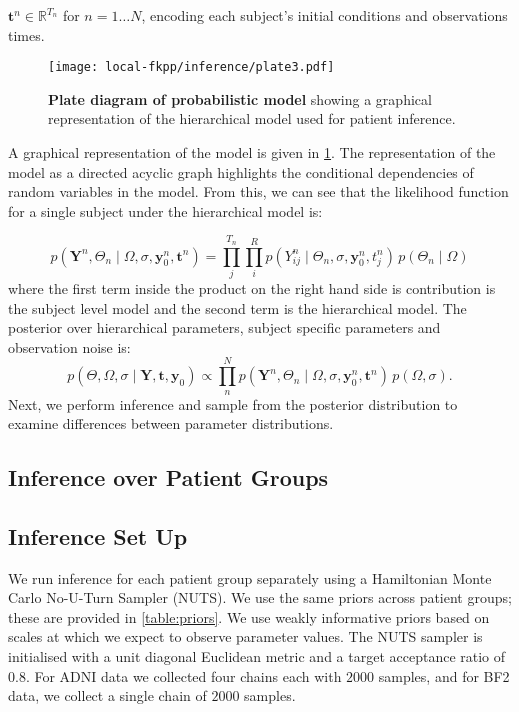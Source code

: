 $\mathbf{t}^{n} \in \mathbb{R}^{T_{n}}$ for $n = 1 \hdots N$, encoding each
subject's initial conditions and observations times.
\begin{figure}[H]
    \centering
    \texttt{[image: local-fkpp/inference/plate3.pdf]}
    \caption{\textbf{Plate diagram of probabilistic model} showing a graphical
    representation of the hierarchical model used for patient inference.}
    \label{fig:plate}
\end{figure}
A graphical representation of the model is given in \cref{fig:plate}. The
representation of the model as a directed acyclic graph highlights the
conditional dependencies of random variables in the model. From this, we can see
that the likelihood function for a single subject under the hierarchical model
is: 

\begin{equation}
    p(\mathbf{Y}^{n}, \Theta_n \mid \Omega, \sigma, \mathbf{y}_{0}^{n}, \mathbf{t}^{n}) = 
    \prod_j^{T_{n}} \prod_i^R p(Y^{n}_{ij} \mid \Theta_n, \sigma, \mathbf{y}^n_0, t^n_j)
    \,p(\Theta_n \mid \Omega)
\end{equation}
where the first term inside the product on the right hand side is contribution
is the subject level model and the second term is the hierarchical model. The
posterior over hierarchical parameters, subject specific parameters and
observation noise is: 
\begin{equation}
    p(\Theta, \Omega, \sigma \mid \mathbf{Y}, \mathbf{t}, \mathbf{y}_{0})  \propto
    \prod_n^N
    p(\mathbf{Y}^{n}, \Theta_n \mid \Omega, \sigma, \mathbf{y}_{0}^{n}, \mathbf{t}^{n})
    \,p(\Omega, \sigma).
\end{equation}
Next, we perform inference and sample from the posterior distribution to examine 
differences between parameter distributions.


\subsection{Inference over Patient Groups}

\subsection*{Inference Set Up}

We run inference for each patient group separately using a Hamiltonian Monte 
Carlo No-U-Turn Sampler (NUTS). We use the same priors across patient groups; 
these are provided in \cref{table:priors}. We use weakly informative 
priors based on scales at which 
we expect to observe parameter values. The NUTS
sampler is initialised with a unit diagonal Euclidean metric and a target
acceptance ratio of $0.8$. For ADNI data we collected four chains
each with $2000$ samples, and for BF2 data, we collect a single chain of $2000$ 
samples.

